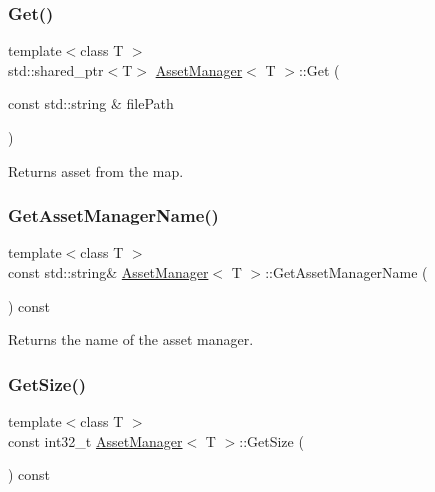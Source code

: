 \subsubsection{\texorpdfstring{Get()}{Get()}}
{\footnotesize\ttfamily template$<$class T $>$ \\
std\+::shared\+\_\+ptr$<$T$>$ \mbox{\hyperlink{class_asset_manager}{Asset\+Manager}}$<$ T $>$\+::Get (\begin{DoxyParamCaption}\item[{const std\+::string \&}]{file\+Path }\end{DoxyParamCaption})\hspace{0.3cm}{\ttfamily [inline]}}

Returns asset from the map. \mbox{\label{class_asset_manager_a7c1faafe83a1dbbd1ae463f1de7b6476}} 
\subsubsection{\texorpdfstring{Get\+Asset\+Manager\+Name()}{GetAssetManagerName()}}
{\footnotesize\ttfamily template$<$class T $>$ \\
const std\+::string\& \mbox{\hyperlink{class_asset_manager}{Asset\+Manager}}$<$ T $>$\+::Get\+Asset\+Manager\+Name (\begin{DoxyParamCaption}{ }\end{DoxyParamCaption}) const\hspace{0.3cm}{\ttfamily [inline]}}

Returns the name of the asset manager. \mbox{\label{class_asset_manager_a329526176de822f96a6b4fb1cb30ce20}} 
\subsubsection{\texorpdfstring{Get\+Size()}{GetSize()}}
{\footnotesize\ttfamily template$<$class T $>$ \\
const int32\+\_\+t \mbox{\hyperlink{class_asset_manager}{Asset\+Manager}}$<$ T $>$\+::Get\+Size (\begin{DoxyParamCaption}{ }\end{DoxyParamCaption}) const\hspace{0.3cm}{\ttfamily [inline]}}

